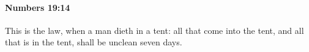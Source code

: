 
		\paragraph{Numbers 19:14} %
			\label{NUMBERS-19-14}

			This is the law, when a man dieth in a tent: all that come into the tent, and all that is in the tent, shall be unclean seven days.


